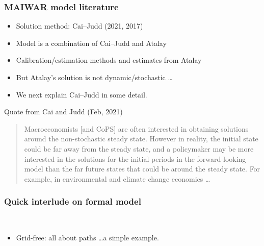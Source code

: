 \documentclass[handout,english]{beamer}
\begin{document}
\begin{frame}\thispagestyle{empty}
  \frametitle{MAIWAR model literature}
  \begin{itemize}
    \item Solution method: Cai--Judd (2021, 2017)
    \item Model is a combination of Cai--Judd and Atalay
    \item Calibration/estimation methods and estimates from Atalay
    \item But Atalay's solution is not dynamic/stochastic
      \dots
    \item We next explain Cai--Judd in some detail.
  \end{itemize}
\end{frame}
\begin{frame}
  {\color{blue} Quote from Cai and Judd (Feb, 2021)}
  \begin{quote}
  {\color{blue} Macroeconomists [and CoPS] are often interested in obtaining solutions around the non-stochastic steady state.}
  {\color{patrickcolor3} However in reality, the initial state could be far away from the steady state, and a policymaker may be more interested in the solutions for the initial periods in the forward-looking model than the far future states that could be around the steady state.}
  {\color{patrickcolor1} For example, in environmental and climate change economics \dots}
\end{quote}
\end{frame}
\begin{frame}
  \frametitle{Quick interlude on formal model}
\\
\begin{itemize}
  \item Grid-free: all about paths \dots a simple example.
\end{itemize}

\vfill\end{frame}
\end{document}
